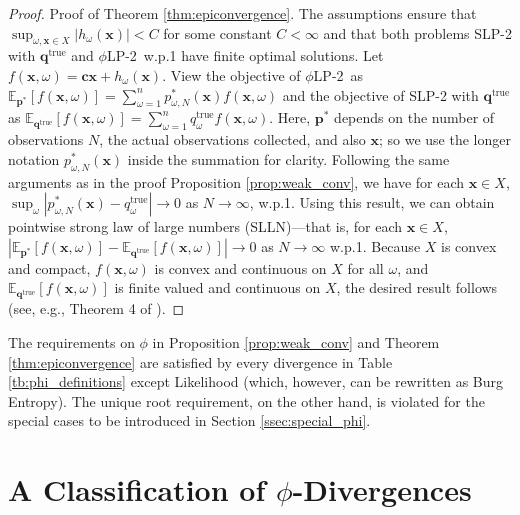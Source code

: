 \documentclass[opre,nonblindrev]{informs3} %
\newcommand{\E}{\mathbb{E}}
\renewcommand{\ee}[2]{\E_{#1} \left[ #2 \right]}
\newcommand{\x}{\mathbf{x}}
\renewcommand{\c}{\mathbf{c}}
\newcommand{\q}{\mathbf{q}}
\newcommand{\p}{\mathbf{p}}
\newcommand{\qtrue}{\q^{\text{true}}}
\newcommand{\plp}{$\phi$LP-2}
\begin{document}
\begin{proof}{\sc Proof of Theorem \ref{thm:epiconvergence}.}
	The assumptions ensure that $\sup_{\omega, \x \in X}|h_\omega(\x)|<C$ for some constant $C<\infty$ and that both problems SLP-2 with $\qtrue$ and  \plp\ w.p.1 have finite optimal solutions.  
   Let $f(\x,\omega)=\c\x + h_\omega(\x)$. 
	View the objective of \plp\ as $\ee{\p^*}{f(\x,\omega)}=\sum_{\omega=1}^{n}p^*_{\omega,N}(\x) f(\x,\omega)$ and the objective of SLP-2 with $\qtrue$ as $\ee{\qtrue}{f(\x,\omega)}=\sum_{\omega=1}^{n}q^{\text{true}}_\omega f(\x,\omega)$. 
	Here, $\p^*$ depends on the number of observations $N$, the actual observations collected, and also $\x$; so we use the longer notation $p^*_{\omega,N}(\x)$ inside the summation for clarity.
	Following the same arguments as in the proof Proposition \ref{prop:weak_conv}, we have for each $\x \in X$, $\sup_\omega |p^*_{\omega, N}(\x) - q^{\text{true}}_\omega| \rightarrow 0$ as $N \rightarrow \infty$, w.p.1. 
	Using this result, we can obtain pointwise strong law of large numbers (SLLN)---that is, for each $\x  \in X$, $|\ee{\p^*}{f(\x,\omega)}-\ee{\qtrue}{f(\x,\omega)}|\rightarrow 0$ as $N\rightarrow \infty$ w.p.1. 
	Because $X$ is convex and compact, $f(\x,\omega)$ is convex and continuous on $X$ for all $\omega$, and $\ee{\qtrue}{f(\x,\omega)}$ is finite valued and continuous on $X$, the desired result follows (see, e.g., Theorem 4 of \cite{shapiro_03}). 
    \Halmos
\end{proof}




The requirements on $\phi$ in Proposition \ref{prop:weak_conv} and Theorem \ref{thm:epiconvergence} are satisfied by every divergence in Table \ref{tb:phi_definitions} except Likelihood (which, however, can be rewritten as Burg Entropy).
The unique root requirement, on the other hand, is violated for the special cases to be introduced in Section \ref{ssec:special_phi}.

\section{A Classification of $\phi$-Divergences}
\label{sec:classification}
\end{document}
